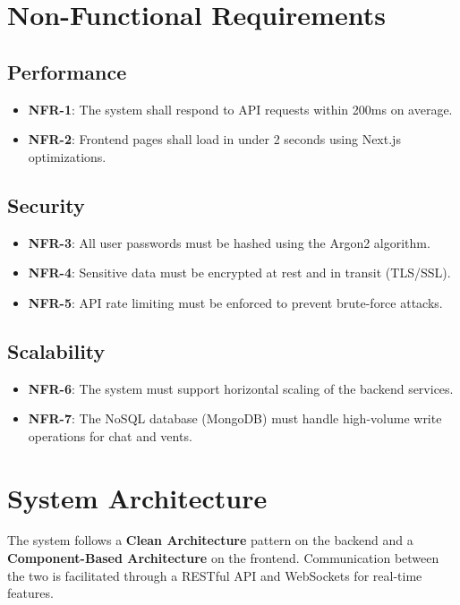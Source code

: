 \documentclass[11pt,a4paper]{article}
\begin{document}
\section{Non-Functional Requirements}

\subsection{Performance}
\begin{itemize}
    \item \textbf{NFR-1}: The system shall respond to API requests within 200ms on average.
    \item \textbf{NFR-2}: Frontend pages shall load in under 2 seconds using Next.js optimizations.
\end{itemize}

\subsection{Security}
\begin{itemize}
    \item \textbf{NFR-3}: All user passwords must be hashed using the Argon2 algorithm.
    \item \textbf{NFR-4}: Sensitive data must be encrypted at rest and in transit (TLS/SSL).
    \item \textbf{NFR-5}: API rate limiting must be enforced to prevent brute-force attacks.
\end{itemize}

\subsection{Scalability}
\begin{itemize}
    \item \textbf{NFR-6}: The system must support horizontal scaling of the backend services.
    \item \textbf{NFR-7}: The NoSQL database (MongoDB) must handle high-volume write operations for chat and vents.
\end{itemize}

\section{System Architecture}
The system follows a \textbf{Clean Architecture} pattern on the backend and a \textbf{Component-Based Architecture} on the frontend. Communication between the two is facilitated through a RESTful API and WebSockets for real-time features.
\end{document}
